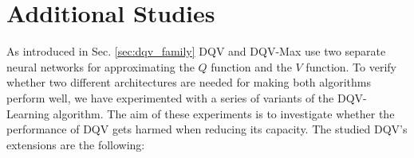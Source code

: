 
\section{Additional Studies}
As introduced in Sec. \ref{sec:dqv_family} DQV and DQV-Max use two separate neural networks for approximating the $Q$ function and the $V$ function. To verify whether two different architectures are needed for making both algorithms perform well, we have experimented with a series of variants of the DQV-Learning algorithm. The aim of these experiments is to investigate whether the performance of DQV gets harmed when reducing its capacity.
The studied DQV's extensions are the following:

